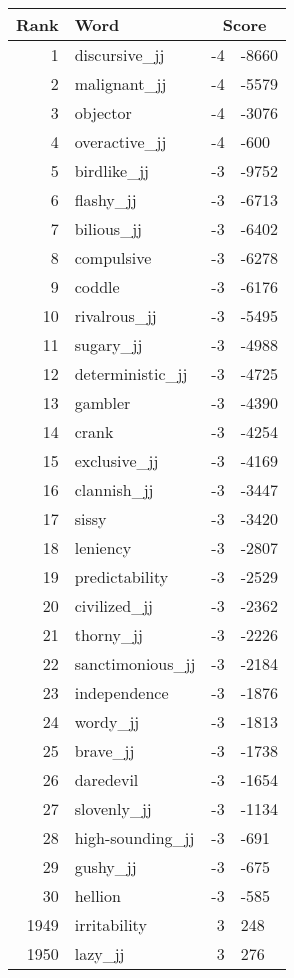 \begin{longtable}[!htbp]{| rlr@{.}l |}
    \hline
    \textbf{Rank} & \textbf{Word} & \multicolumn{2}{c|}{\textbf{Score}} \\
    \hline
    \endhead
    1 & discursive\_jj & -4 & -8660 \\
    2 & malignant\_jj & -4 & -5579 \\
    3 & objector & -4 & -3076 \\
    4 & overactive\_jj & -4 & -600 \\
    5 & birdlike\_jj & -3 & -9752 \\
    6 & flashy\_jj & -3 & -6713 \\
    7 & bilious\_jj & -3 & -6402 \\
    8 & compulsive & -3 & -6278 \\
    9 & coddle & -3 & -6176 \\
    10 & rivalrous\_jj & -3 & -5495 \\
    11 & sugary\_jj & -3 & -4988 \\
    12 & deterministic\_jj & -3 & -4725 \\
    13 & gambler & -3 & -4390 \\
    14 & crank & -3 & -4254 \\
    15 & exclusive\_jj & -3 & -4169 \\
    16 & clannish\_jj & -3 & -3447 \\
    17 & sissy & -3 & -3420 \\
    18 & leniency & -3 & -2807 \\
    19 & predictability & -3 & -2529 \\
    20 & civilized\_jj & -3 & -2362 \\
    21 & thorny\_jj & -3 & -2226 \\
    22 & sanctimonious\_jj & -3 & -2184 \\
    23 & independence & -3 & -1876 \\
    24 & wordy\_jj & -3 & -1813 \\
    25 & brave\_jj & -3 & -1738 \\
    26 & daredevil & -3 & -1654 \\
    27 & slovenly\_jj & -3 & -1134 \\
    28 & high-sounding\_jj & -3 & -691 \\
    29 & gushy\_jj & -3 & -675 \\
    30 & hellion & -3 & -585 \\
    1949 & irritability & 3 & 248 \\
    1950 & lazy\_jj & 3 & 276 \\

\end{longtable}
